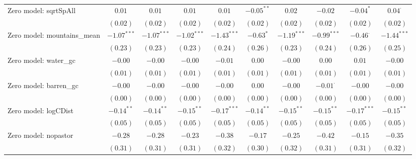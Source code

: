 \begin{center}
\begin{longtable}{l c c c c c c c c c}
Zero model: sqrtSpAll          & $0.01$         & $0.01$         & $0.01$         & $0.01$          & $-0.05^{**}$   & $0.02$          & $-0.02$         & $-0.04^{*}$     & $0.04^{\cdot}$ \\
                               & $(0.02)$       & $(0.02)$       & $(0.02)$       & $(0.02)$        & $(0.02)$       & $(0.02)$        & $(0.02)$        & $(0.02)$        & $(0.02)$       \\
Zero model: mountains\_mean    & $-1.07^{***}$  & $-1.07^{***}$  & $-1.02^{***}$  & $-1.43^{***}$   & $-0.63^{*}$    & $-1.19^{***}$   & $-0.99^{***}$   & $-0.46^{\cdot}$ & $-1.44^{***}$  \\
                               & $(0.23)$       & $(0.23)$       & $(0.23)$       & $(0.24)$        & $(0.26)$       & $(0.23)$        & $(0.24)$        & $(0.26)$        & $(0.25)$       \\
Zero model: water\_gc          & $-0.00$        & $-0.00$        & $-0.00$        & $-0.01$         & $0.00$         & $-0.00$         & $0.00$          & $0.01$          & $-0.00$        \\
                               & $(0.01)$       & $(0.01)$       & $(0.01)$       & $(0.01)$        & $(0.01)$       & $(0.01)$        & $(0.01)$        & $(0.01)$        & $(0.01)$       \\
Zero model: barren\_gc         & $-0.00$        & $-0.00$        & $-0.00$        & $-0.00$         & $0.00$         & $-0.00$         & $-0.01^{\cdot}$ & $-0.00$         & $-0.00$        \\
                               & $(0.00)$       & $(0.00)$       & $(0.00)$       & $(0.00)$        & $(0.00)$       & $(0.00)$        & $(0.00)$        & $(0.00)$        & $(0.00)$       \\
Zero model: logCDist           & $-0.14^{**}$   & $-0.14^{**}$   & $-0.15^{**}$   & $-0.17^{***}$   & $-0.14^{**}$   & $-0.15^{**}$    & $-0.15^{**}$    & $-0.17^{***}$   & $-0.15^{**}$   \\
                               & $(0.05)$       & $(0.05)$       & $(0.05)$       & $(0.05)$        & $(0.05)$       & $(0.05)$        & $(0.05)$        & $(0.05)$        & $(0.05)$       \\
Zero model: nopastor           & $-0.28$        & $-0.28$        & $-0.23$        & $-0.38$         & $-0.17$        & $-0.25$         & $-0.42$         & $-0.15$         & $-0.35$        \\
                               & $(0.31)$       & $(0.31)$       & $(0.31)$       & $(0.32)$        & $(0.30)$       & $(0.32)$        & $(0.31)$        & $(0.31)$        & $(0.32)$       \\

\end{longtable}
\end{center}
